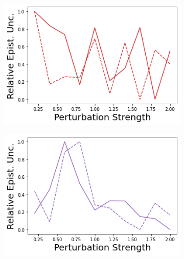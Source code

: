 \begin{figure}
    \begin{subfigure}{.245\textwidth}
        \includegraphics[width=\textwidth]{sections/011_icml2022/resources/action_shift-DropOut-AcrobotShift-v0-mean_epistemic_uncertainty_.png}
    \end{subfigure}
    \begin{subfigure}{.245\textwidth}
        \includegraphics[width=\textwidth]{sections/011_icml2022/resources/action_shift-Ensemble-AcrobotShift-v0-mean_epistemic_uncertainty_.png}
    \end{subfigure}
    \begin{subfigure}{.245\textwidth}

\end{subfigure}
\end{figure}
